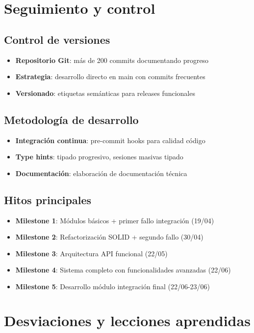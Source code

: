 \section{Seguimiento y control}

\subsection{Control de versiones}
\begin{itemize}
    \item \textbf{Repositorio Git}: más de 200 commits documentando progreso
    \item \textbf{Estrategia}: desarrollo directo en main con commits frecuentes
    \item \textbf{Versionado}: etiquetas semánticas para releases funcionales
\end{itemize}

\subsection{Metodología de desarrollo}
\begin{itemize}
    \item \textbf{Integración continua}: pre-commit hooks para calidad código
    \item \textbf{Type hints}: tipado progresivo, sesiones masivas tipado
    \item \textbf{Documentación}: elaboración de documentación técnica
\end{itemize}

\subsection{Hitos principales}
\begin{itemize}
    \item \textbf{Milestone 1}: Módulos básicos + primer fallo integración (19/04)
    \item \textbf{Milestone 2}: Refactorización SOLID + segundo fallo (30/04)
    \item \textbf{Milestone 3}: Arquitectura API funcional (22/05)
    \item \textbf{Milestone 4}: Sistema completo con funcionalidades avanzadas (22/06)
    \item \textbf{Milestone 5}: Desarrollo módulo integración final (22/06-23/06)
\end{itemize}

\section{Desviaciones y lecciones aprendidas}

